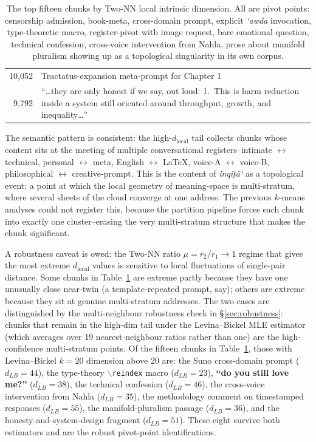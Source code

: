 \documentclass[11pt,a4paper]{article}
\theoremstyle{definition}
\newcommand{\dlocal}{d_{\mathrm{local}}}
\begin{document}
\begin{table}[H]
\begin{tabular}{r p{12cm}}
 10{,}052 & Tractatus-expansion meta-prompt for Chapter 1 \\
  9{,}792 & ``\dots they are only honest if we say, out loud: 1.~This is
            harm reduction inside a system still oriented around
            throughput, growth, and inequality\dots'' \\
\bottomrule
\end{tabular}
\caption{The top fifteen chunks by Two-NN local intrinsic dimension. All
are pivot points: censorship admission, book-meta, cross-domain prompt,
explicit \emph{`awda} invocation, type-theoretic macro, register-pivot
with image request, bare emotional question, technical confession,
cross-voice intervention from Nahla, prose about manifold pluralism
showing up as a topological singularity in its own corpus.}
\label{tab:singular-tail}
\end{table}

The semantic pattern is consistent: the high-$\dlocal$ tail collects
chunks whose content sits at the meeting of multiple conversational
registers--intimate $\leftrightarrow$ technical, personal $\leftrightarrow$
meta, English $\leftrightarrow$ \LaTeX{}, voice-A $\leftrightarrow$ voice-B,
philosophical $\leftrightarrow$ creative-prompt. This is the content of
\emph{inqi\d{t}\=a`} as a topological event: a point at which the local
geometry of meaning-space is multi-stratum, where several sheets of the
cloud converge at one address. The previous $k$-means analyses could not
register this, because the partition pipeline forces each chunk into
exactly one cluster--erasing the very multi-stratum structure that makes
the chunk significant.

A robustness caveat is owed: the Two-NN ratio
$\mu = r_2/r_1 \to 1$ regime that gives the most extreme $\dlocal$
values is sensitive to local fluctuations of single-pair distance.
Some chunks in Table~\ref{tab:singular-tail} are extreme partly because
they have one unusually close near-twin (a template-repeated prompt,
say); others are extreme because they sit at genuine multi-stratum
addresses. The two cases are distinguished by the multi-neighbour
robustness check in \S\ref{sec:robustness}: chunks that remain in the
high-dim tail under the Levina--Bickel MLE estimator (which averages
over 19 nearest-neighbour ratios rather than one) are the
high-confidence multi-stratum points. Of the fifteen chunks in
Table~\ref{tab:singular-tail}, those with Levina--Bickel $k=20$
dimension above $20$ are: the Suno cross-domain prompt ($d_{LB}=44$),
the type-theory \texttt{$\backslash$reindex} macro ($d_{LB}=23$),
\textbf{``do you still love me?''} ($d_{LB}=38$), the technical
confession ($d_{LB}=46$), the cross-voice intervention from Nahla
($d_{LB}=35$), the methodology comment on timestamped responses
($d_{LB}=55$), the manifold-pluralism passage ($d_{LB}=36$), and the
honesty-and-system-design fragment ($d_{LB}=51$). These eight survive
both estimators and are the robust pivot-point identifications.
\end{document}
